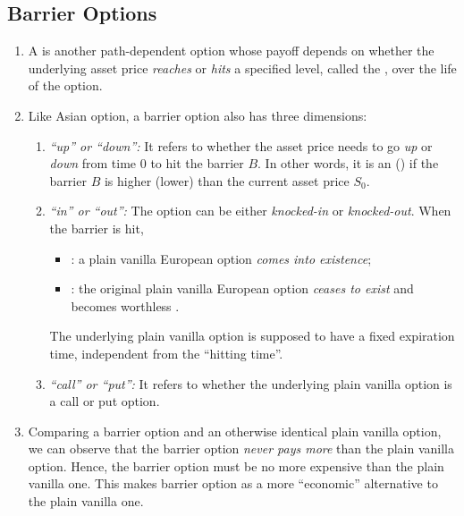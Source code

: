 \subsection{Barrier Options}
\label{subsect:barrier-option}
\begin{enumerate}
\item A  is another path-dependent option whose payoff
depends on whether the underlying asset price \emph{reaches} or \emph{hits} a
specified level, called the , over the life of the option. 

\item Like Asian option, a barrier option also has three dimensions:
\begin{enumerate}[label={(\arabic*)}]
\item \emph{``up'' or ``down'':} It refers to whether the asset price needs to
go \emph{up}  or \emph{down}  from time 0
to hit the barrier \(B\). In other words, it is an  ()
if the barrier \(B\) is higher (lower) than the current asset price
\(S_0\).
\item \emph{``in'' or ``out'':} The option can be either \emph{knocked-in} or
\emph{knocked-out}. When the barrier is hit,
\begin{itemize}
\item {}: a plain vanilla European option \emph{comes into
existence};
\item {}: the original plain vanilla European option
\emph{ceases to exist} and becomes worthless .
\end{itemize}
\begin{note}
The underlying plain vanilla option is supposed to have a fixed expiration
time, independent from the ``hitting time''.
\end{note}
\item \emph{``call'' or ``put'':} It refers to whether the underlying plain
vanilla option is a call or put option.
\end{enumerate}

\item Comparing a barrier option and an otherwise identical plain vanilla
option, we can observe that the barrier option \emph{never pays more} than the
plain vanilla option. Hence, the barrier option must be no more expensive
than the plain vanilla one. This makes barrier option as a more ``economic''
alternative to the plain vanilla one.


\end{enumerate}
